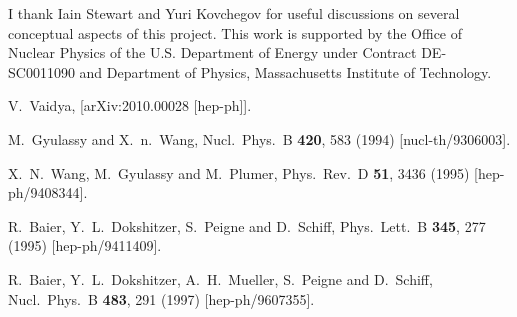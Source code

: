\documentclass[letter,11pt]{article}
\begin{document}


\acknowledgments
I thank Iain Stewart and Yuri Kovchegov for useful discussions on several conceptual aspects of this project. This work is supported by the Office of Nuclear Physics of the U.S. Department of Energy under Contract DE-SC0011090 and Department of Physics, Massachusetts Institute of Technology.

\begin{thebibliography}{99}


V.~Vaidya,
[arXiv:2010.00028 [hep-ph]].

  M.~Gyulassy and X.~n.~Wang,
  Nucl.\ Phys.\ B {\bf 420}, 583 (1994)
  [nucl-th/9306003].

  X.~N.~Wang, M.~Gyulassy and M.~Plumer,
  Phys.\ Rev.\ D {\bf 51}, 3436 (1995)
  [hep-ph/9408344].

  R.~Baier, Y.~L.~Dokshitzer, S.~Peigne and D.~Schiff,
  Phys.\ Lett.\ B {\bf 345}, 277 (1995)
  [hep-ph/9411409].

  R.~Baier, Y.~L.~Dokshitzer, A.~H.~Mueller, S.~Peigne and D.~Schiff,
  Nucl.\ Phys.\ B {\bf 483}, 291 (1997)
  [hep-ph/9607355].


\end{thebibliography}
\end{document}
